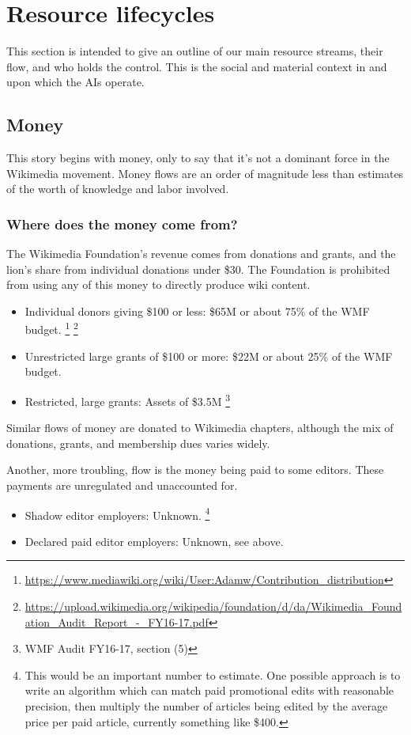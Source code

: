 \section{Resource lifecycles}

This section is intended to give an outline of our main resource streams, their flow, and who holds the control.  This is the social and material context in and upon which the AIs operate.

\subsection{Money}

This story begins with money, only to say that it's not a dominant force in the Wikimedia movement.  Money flows are an order of magnitude less than estimates of the worth of knowledge and labor involved.

\subsubsection{Where does the money come from?}

The Wikimedia Foundation's revenue comes from donations and grants, and the lion's share from individual donations under \$30.  The Foundation is prohibited from using any of this money to directly produce wiki content.

\begin{itemize}
\item Individual donors giving \$100 or less: \$65M or about 75\% of the WMF budget.
\footnote{\url{https://www.mediawiki.org/wiki/User:Adamw/Contribution_distribution}}
\footnote{\label{wmfaudit}\url{https://upload.wikimedia.org/wikipedia/foundation/d/da/Wikimedia_Foundation_Audit_Report_-_FY16-17.pdf}}
\item Unrestricted large grants of \$100 or more: \$22M or about 25\% of the WMF budget.
\item Restricted, large grants: Assets of \$3.5M
\footnote{WMF Audit FY16-17, section (5)}
\end{itemize}

Similar flows of money are donated to Wikimedia chapters, although the mix of donations, grants, and membership dues varies widely.

Another, more troubling, flow is the money being paid to some editors.  These payments are unregulated and unaccounted for.
\begin{itemize}
\item Shadow editor employers: Unknown.
\footnote{This would be an important number to estimate.  One possible approach is to write an algorithm which can match paid promotional edits with reasonable precision, then multiply the number of articles being edited by the average price per paid article, currently something like \$400.}
\item Declared paid editor employers: Unknown, see above.
\end{itemize}

